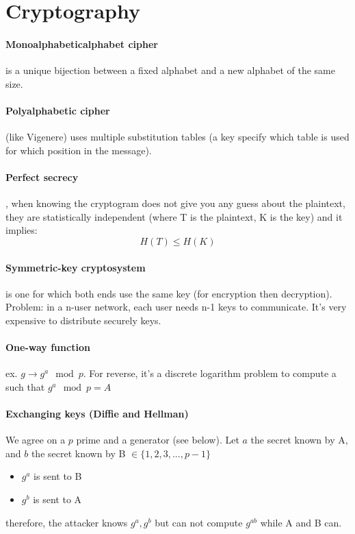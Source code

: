 \documentclass{article}
\begin{document}
\section{Cryptography}

\paragraph{Monoalphabeticalphabet cipher} is a unique bijection between a fixed alphabet and a new alphabet of the same size.

\paragraph{Polyalphabetic cipher} (like Vigenere) uses multiple substitution tables (a key specify which table is used for which position in the message).

\paragraph{Perfect secrecy}, when knowing the cryptogram does not give you any guess about the plaintext, they are statistically independent (where T is the plaintext, K is the key) and it implies:
\[ H(T) \leq H(K) \]

\paragraph{Symmetric-key cryptosystem} is one for which both ends use the same key (for encryption then decryption). Problem: in a n-user network, each user needs n-1 keys to communicate. It's very expensive to distribute securely keys.

\paragraph{One-way function} ex. $ g \to g^a \mod{p} $. For reverse, it's a discrete logarithm problem to compute a such that $ g^a \mod p = A $

\paragraph{Exchanging keys (Diffie and Hellman)} We agree on a $ p $ prime and a generator (see below).
Let $ a $ the secret known by A, and $ b $ the secret known by  B $ \in \{ 1, 2, 3, ..., p-1 \} $
\begin{itemize}
    \item $ g^a $ is sent to B
    \item $ g^b $ is sent to A
\end{itemize}
therefore, the attacker knows $ g^a, g^b $ but can not compute $ g^{ab} $ while A and B can.
\end{document}
